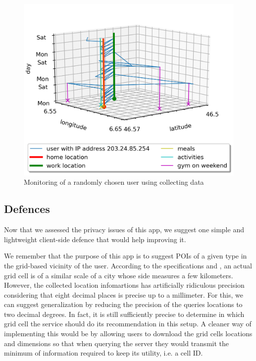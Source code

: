 \documentclass[10pt,conference,compsocconf]{IEEEtran}
\begin{document}
\begin{figure}
  \includegraphics[width=\columnwidth]{random.png}
  \caption{Monitoring of a randomly chosen user using collecting data}
  \label{random_fig}
\end{figure}

\subsection{Defences}
Now  that we assessed the privacy issues of this app, we suggest one simple and lightweight client-side defence that would help improving it.

We remember that the purpose of this app is to suggest POIs of a given type in the grid-based vicinity of the user. According to the specifications and \cite{deg}, an actual grid cell is of a similar scale of a city whose side measures a few kilometers. However, the collected location infomartions has artificially ridiculous precision considering that eight decimal places is precise up to a millimeter\cite{relevant_xkcd}. For this, we can suggest generalization by reducing the precision of the queries locations to two decimal degrees. In fact, it is still sufficiently precise to determine in which grid cell the service should do its recommendation in this setup. A cleaner way of implementing this would be by allowing users to download the grid cells locations and dimensions so that when querying the server they would transmit the minimum of information required to keep its utility, i.e. a cell ID.
\end{document}
